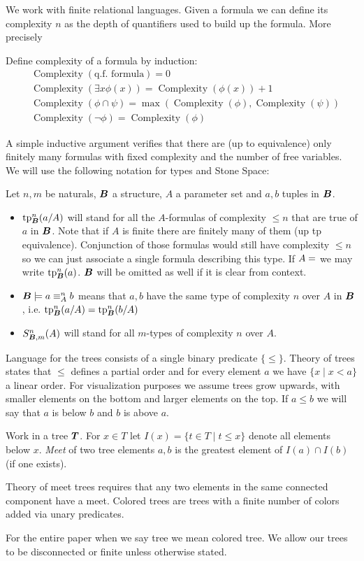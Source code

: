 \documentclass{amsart}
\DeclareMathOperator{\TT}{\boldface T}
\DeclareMathOperator{\B}{\boldface B}
\DeclareMathOperator{\cx}{Complexity}
\begin{document}
{We work with finite relational languages. Given a formula we can define its complexity $n$ as the depth of quantifiers used to build up the formula. More precisely
\begin{Definition}
Define complexity of a formula by induction:
\begin{align*}
	&\cx(\text{q.f. formula}) = 0 \\
	&\cx(\exists x \phi(x)) = \cx(\phi(x)) + 1 \\
	&\cx(\phi \cap \psi) = \max(\cx(\phi), \cx(\psi)) \\
	&\cx(\neg \phi) = \cx(\phi)
\end{align*}
\end{Definition}
A simple inductive argument verifies that there are (up to equivalence) only finitely many formulas with fixed complexity and the number of free variables. We will use the following notation for types and Stone Space:
\begin{Definition} Let $n,m$ be naturals, $\B$ a structure, $A$ a parameter set and $a,b$ tuples in $\B$.
	\begin{itemize}
		\item $\tp^n_{\B}(a/A)$ will stand for all the $A$-formulas of complexity $\leq n$ that are true of $a$ in $\B$. Note that if $A$ is finite there are finitely many of them (up tp equivalence). Conjunction of those formulas would still have complexity $\leq n$ so we can just associate a single formula describing this type. If $A = \empty$ we may write $\tp^n_{\B}(a)$. $\B$ will be omitted as well if it is clear from context.
		\item $\B \models a \equiv^n_A b$ means that $a,b$ have the same type of complexity $n$ over $A$ in $\B$, i.e. $\tp^n_{\B}(a/A) = \tp^n_{\B}(b/A)$
		\item $S^n_{\B, m}(A)$ will stand for all $m$-types of complexity $n$ over $A$.
	\end{itemize}
\end{Definition}

Language for the trees consists of a single binary predicate $\{\leq\}$. Theory of trees states that $\leq$ defines a partial order and for every element $a$ we have $\{x \mid x < a\}$ a linear order. For visualization purposes we assume trees grow upwards, with smaller elements on the bottom and larger elements on the top. If $a \leq b$ we will say that $a$ is below $b$ and $b$ is above $a$.

\begin{Definition}
	Work in a tree $\TT$. For $x \in T$ let $I(x) = \{t \in T \mid t \leq x\}$ denote all elements below $x$. \emph{Meet} of two tree elements $a,b$ is the greatest element of $I(a) \cap I(b)$ (if one exists).
\end{Definition}

Theory of meet trees requires that any two elements in the same connected component have a meet. Colored trees are trees with a finite number of colors added via unary predicates.

For the entire paper when we say tree we mean colored tree. We allow our trees to be disconnected or finite unless otherwise stated.
}
\end{document}
